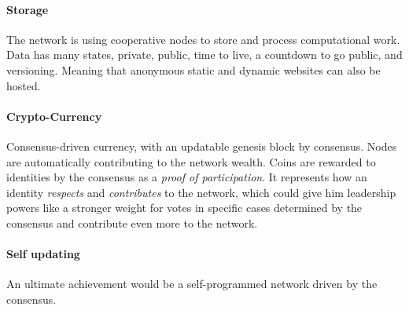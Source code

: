 \paragraph{Storage}
The network is using cooperative nodes to store and process computational work. Data has many states, private, public, time to live, a countdown to go public, and versioning. Meaning that anonymous static and dynamic websites can also be hosted.

\paragraph{Crypto-Currency}
Consensus-driven currency, with an updatable genesis block by consensus. Nodes are automatically contributing to the network wealth. Coins are rewarded to identities by the consensus as a \textit{proof of participation}. It represents how an identity \textit{respects} and \textit{contributes} to the network, which could give him leadership powers like a stronger weight for votes in specific cases determined by the consensus and contribute even more to the network.

\paragraph{Self updating}
An ultimate achievement would be a self-programmed network driven by the consensus.\cite{Gabel2008DynamicallyDevelopers}

